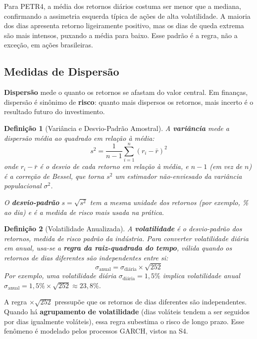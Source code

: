 \documentclass[11pt,a4paper]{article}
\theoremstyle{quant}
\newtheorem{definicao}{Definição}[section]
\begin{document}
\begin{caixainsight}
Para PETR4, a média dos retornos diários costuma ser menor que a mediana,
confirmando a assimetria esquerda típica de ações de alta volatilidade.
A maioria dos dias apresenta retorno ligeiramente positivo, mas os dias de queda
extrema são mais intensos, puxando a média para baixo. Esse padrão é a regra,
não a exceção, em ações brasileiras.
\end{caixainsight}

\subsection{Medidas de Dispersão}

\textbf{Dispersão} mede o quanto os retornos se afastam do valor central.
Em finanças, dispersão é sinônimo de \textbf{risco}: quanto mais dispersos os
retornos, mais incerto é o resultado futuro do investimento.

\begin{definicao}[Variância e Desvio-Padrão Amostral]
A \textbf{variância} mede a dispersão média ao quadrado em relação à média:
\[
  s^2 = \frac{1}{n-1}\sum_{i=1}^{n}(r_i - \bar{r})^2
\]
onde $r_i - \bar{r}$ é o desvio de cada retorno em relação à média, e $n-1$
(em vez de $n$) é a correção de Bessel, que torna $s^2$ um estimador não-enviesado
da variância populacional $\sigma^2$.

O \textbf{desvio-padrão} $s = \sqrt{s^2}$ tem a mesma unidade dos retornos
(por exemplo, \% ao dia) e é a medida de risco mais usada na prática.
\end{definicao}

\begin{definicao}[Volatilidade Anualizada]
A \textbf{volatilidade} é o desvio-padrão dos retornos, medida de risco padrão
da indústria. Para converter volatilidade diária em anual, usa-se a
\textbf{regra da raiz-quadrada do tempo}, válida quando os retornos de dias
diferentes são independentes entre si:
\[
  \sigma_{\text{anual}} = \sigma_{\text{diária}} \times \sqrt{252}
\]
Por exemplo, uma volatilidade diária $\sigma_{\text{diária}} = 1{,}5\%$ implica
volatilidade anual $\sigma_{\text{anual}} = 1{,}5\% \times \sqrt{252} \approx 23{,}8\%$.
\end{definicao}

\begin{caixaatencao}
A regra $\times\sqrt{252}$ pressupõe que os retornos de dias diferentes são
independentes. Quando há \textbf{agrupamento de volatilidade} (dias voláteis
tendem a ser seguidos por dias igualmente voláteis), essa regra subestima o
risco de longo prazo. Esse fenômeno é modelado pelos processos GARCH, vistos na S4.
\end{caixaatencao}
\end{document}
